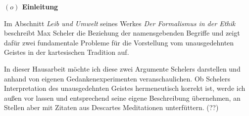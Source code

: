 \documentclass[a4paper, 12pt]{article}
\begin{document}
\begin{onehalfspace} 

\noindent\textbf{$(o)$ Einleitung}

\noindent Im Abschnitt \emph{Leib und Umwelt} seines Werkes \emph{Der Formalismus in der Ethik} beschreibt Max Scheler die Beziehung der namensgebenden Begriffe und zeigt dafür zwei fundamentale Probleme für die Vorstellung vom unausgedehnten Geistes in der kartesischen Tradition auf.%

In dieser Hausarbeit möchte ich diese zwei Argumente Schelers darstellen und anhand von eigenen Gedankenexperimenten veranschaulichen. Ob Schelers Interpretation des unausgedehnten Geistes hermeneutisch korrekt ist, werde ich außen vor lassen und entsprechend seine eigene Beschreibung übernehmen, an Stellen aber mit Zitaten aus Descartes Meditationen unterfüttern. (??) 









\end{onehalfspace}
\end{document}
